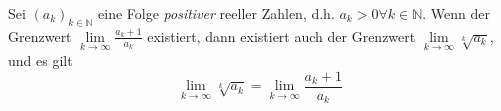 Sei $(a_k)_{k \in \mathbb{N}}$ eine Folge \textit{positiver} reeller Zahlen, d.h. $a_k > 0 \forall k \in \mathbb{N}$. Wenn der Grenzwert $\lim\limits_{k \to \infty} \frac{a_k+1}{a_k}$ existiert, dann existiert auch der Grenzwert $\lim\limits_{k \to \infty} \sqrt[k]{a_k}$, und es gilt
$$\lim_{k \to \infty} \sqrt[k]{a_k} = \lim_{k \to \infty} \frac{a_k+1}{a_k}$$